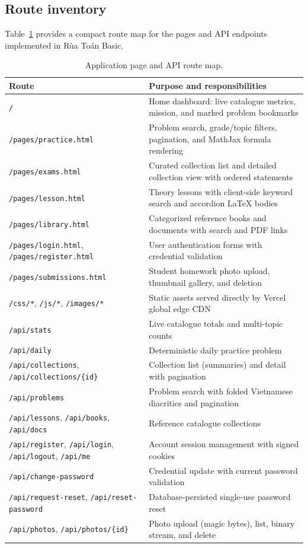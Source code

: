 \subsection{Route inventory}
Table~\ref{tab:routes} provides a compact route map for the pages and API endpoints implemented in Rùa Toán Basic.

\begin{table}[ht]
\centering\small
\begin{tabularx}{\textwidth}{@{}l >{\raggedright\arraybackslash}X@{}}
\toprule
\textbf{Route} & \textbf{Purpose and responsibilities}\\
\midrule
\texttt{/} & Home dashboard: live catalogue metrics, mission, and marked problem bookmarks\\
\texttt{/pages/practice.html} & Problem search, grade/topic filters, pagination, and MathJax formula rendering\\
\texttt{/pages/exams.html} & Curated collection list and detailed collection view with ordered statements\\
\texttt{/pages/lesson.html} & Theory lessons with client-side keyword search and accordion LaTeX bodies\\
\texttt{/pages/library.html} & Categorized reference books and documents with search and PDF links\\
\texttt{/pages/login.html}, \texttt{/pages/register.html} & User authentication forms with credential validation\\
\texttt{/pages/submissions.html} & Student homework photo upload, thumbnail gallery, and deletion\\
\texttt{/css/*}, \texttt{/js/*}, \texttt{/images/*} & Static assets served directly by Vercel global edge CDN\\
\texttt{/api/stats} & Live catalogue totals and multi-topic counts\\
\texttt{/api/daily} & Deterministic daily practice problem\\
\texttt{/api/collections}, \texttt{/api/collections/\{id\}} & Collection list (summaries) and detail with pagination\\
\texttt{/api/problems} & Problem search with folded Vietnamese diacritics and pagination\\
\texttt{/api/lessons}, \texttt{/api/books}, \texttt{/api/docs} & Reference catalogue collections\\
\texttt{/api/register}, \texttt{/api/login}, \texttt{/api/logout}, \texttt{/api/me} & Account session management with signed cookies\\
\texttt{/api/change-password} & Credential update with current password validation\\
\texttt{/api/request-reset}, \texttt{/api/reset-password} & Database-persisted single-use password reset\\
\texttt{/api/photos}, \texttt{/api/photos/\{id\}} & Photo upload (magic bytes), list, binary stream, and delete\\
\bottomrule
\end{tabularx}
\caption{Application page and API route map.}
\label{tab:routes}
\end{table}

